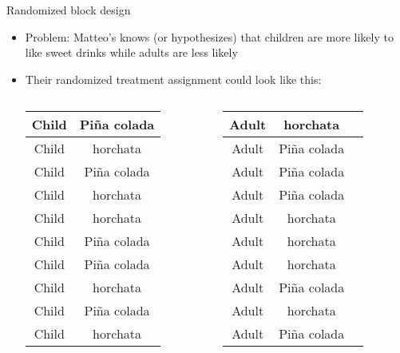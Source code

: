 \documentclass[xcolor=dvipsnames]{beamer}
\begin{document}
\begin{frame}{Randomized block design}
	\begin{itemize}
		\item Problem: Matteo's knows (or hypothesizes) that children are more likely to like sweet drinks while adults are less likely \pause
		\item Their randomized treatment assignment could look like this: \vspace{-1mm} \pause
		\begin{columns}
			\begin{column}{.5\linewidth}
				\begin{flushright}
					\begin{tabular}{|c|c|}
						\hline 
						Child	& Pi\~{n}a colada \\ 
						\hline 
						Child	& horchata \\ 
						\hline 
						Child	& Pi\~{n}a colada  \\ 
						\hline 
						Child	& horchata \\ 
						\hline 
						Child	& horchata \\ 
						\hline 
						Child	& Pi\~{n}a colada \\ 
						\hline 
						Child	& Pi\~{n}a colada \\ 
						\hline 
						Child	& horchata \\ 
						\hline 
						Child	& Pi\~{n}a colada\\ 
						\hline 
						Child	& horchata  \\ 
						\hline 
					\end{tabular} 
				\end{flushright}
			\end{column}
			\begin{column}{.5\linewidth}
				\begin{flushleft}
					\begin{tabular}{|c|c|c|}
						\hline 
						Adult	&  horchata\\ 
						\hline 
						Adult	& Pi\~{n}a colada\\ 
						\hline 
						Adult	& Pi\~{n}a colada  \\ 
						\hline 
						Adult	& Pi\~{n}a colada \\ 
						\hline 
						Adult	& horchata \\ 
						\hline 
						Adult	& horchata \\ 
						\hline 
						Adult	& horchata \\ 
						\hline 
						Adult	& Pi\~{n}a colada \\ 
						\hline 
						Adult	& horchata \\ 
						\hline 
						Adult	& Pi\~{n}a colada\\ 
						\hline 
					\end{tabular} 
				\end{flushleft}
			\end{column}
		\end{columns}
	\end{itemize}
\end{frame}
\end{document}
